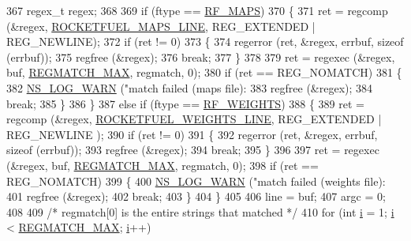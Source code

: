 \begin{DoxyCode}
367       regex\_t regex;
368 
369       \textcolor{keywordflow}{if} (ftype == \hyperlink{classns3_1_1RocketfuelTopologyReader_a04346285f097be349a70c57315a42415a845bfbcfcea49def2cce65b5e9c0c2f5}{RF\_MAPS})
370         \{
371           ret = regcomp (&regex, \hyperlink{rocketfuel-topology-reader_8cc_a158bb886cca27e42e534b4a16a6a4f35}{ROCKETFUEL\_MAPS\_LINE}, REG\_EXTENDED | REG\_NEWLINE);
372           \textcolor{keywordflow}{if} (ret != 0)
373             \{
374               regerror (ret, &regex, errbuf, \textcolor{keyword}{sizeof} (errbuf));
375               regfree (&regex);
376               \textcolor{keywordflow}{break};
377             \}
378 
379           ret = regexec (&regex, buf, \hyperlink{rocketfuel-topology-reader_8cc_a6060444660288a903075761dcfcb32d3}{REGMATCH\_MAX}, regmatch, 0);
380           \textcolor{keywordflow}{if} (ret == REG\_NOMATCH)
381             \{
382               \hyperlink{group__logging_gade7208b4009cdf0e25783cd26766f559}{NS\_LOG\_WARN} (\textcolor{stringliteral}{"match failed (maps file): %
383               regfree (&regex);
384               \textcolor{keywordflow}{break};
385             \}
386         \}
387       \textcolor{keywordflow}{else} \textcolor{keywordflow}{if} (ftype == \hyperlink{classns3_1_1RocketfuelTopologyReader_a04346285f097be349a70c57315a42415abed804021a51dbea02727a00544cbb75}{RF\_WEIGHTS})
388         \{
389           ret = regcomp (&regex, \hyperlink{rocketfuel-topology-reader_8cc_a3bc3a698d16d454a03f538d762f6a295}{ROCKETFUEL\_WEIGHTS\_LINE}, REG\_EXTENDED | REG\_NEWLINE
      );
390           \textcolor{keywordflow}{if} (ret != 0)
391             \{
392               regerror (ret, &regex, errbuf, \textcolor{keyword}{sizeof} (errbuf));
393               regfree (&regex);
394               \textcolor{keywordflow}{break};
395             \}
396 
397           ret = regexec (&regex, buf, \hyperlink{rocketfuel-topology-reader_8cc_a6060444660288a903075761dcfcb32d3}{REGMATCH\_MAX}, regmatch, 0);
398           \textcolor{keywordflow}{if} (ret == REG\_NOMATCH)
399             \{
400               \hyperlink{group__logging_gade7208b4009cdf0e25783cd26766f559}{NS\_LOG\_WARN} (\textcolor{stringliteral}{"match failed (weights file): %
401               regfree (&regex);
402               \textcolor{keywordflow}{break};
403             \}
404         \}
405 
406       line = buf;
407       argc = 0;
408 
409       \textcolor{comment}{/* regmatch[0] is the entire strings that matched */}
410       \textcolor{keywordflow}{for} (\textcolor{keywordtype}{int} \hyperlink{bernuolliDistribution_8m_a6f6ccfcf58b31cb6412107d9d5281426}{i} = 1; \hyperlink{bernuolliDistribution_8m_a6f6ccfcf58b31cb6412107d9d5281426}{i} < \hyperlink{rocketfuel-topology-reader_8cc_a6060444660288a903075761dcfcb32d3}{REGMATCH\_MAX}; \hyperlink{bernuolliDistribution_8m_a6f6ccfcf58b31cb6412107d9d5281426}{i}++)
}}
\end{DoxyCode}
